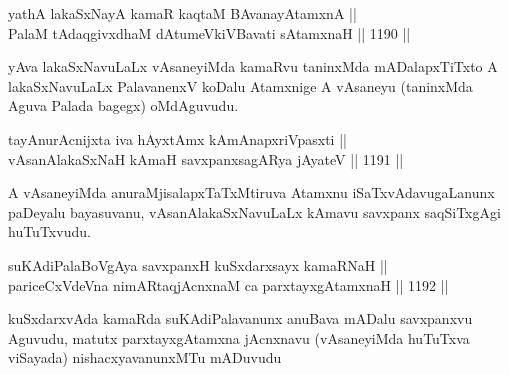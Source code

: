 
\begin{shl}
\footnotemark[2]yathA lakaSxNayA kamaR kaqtaM BAvanayA\s \s tamxnA || \\
PalaM tAdaqgivxdhaM dAtumeVkiVBavati sA\s \s tamxnaH \hfill || 1190 ||  
\end{shl}

\begin{artha}
yAva lakaSxNavuLaLx vAsaneyiMda kamaRvu taninxMda mADalapxTiTxto A lakaSxNavuLaLx PalavanenxV koDalu Atamxnige A vAsaneyu (taninxMda Aguva Palada bagegx) oMdAguvudu.
\end{artha}

\begin{shl}
\footnotemark[3]tayA\s nurAcnijxta iva hAyxtAmx kAmAnapxriVpasxti || \\
vAsanAlakaSxNaH kAmaH savxpanxsagARya jAyateV \hfill || 1191 || 
\end{shl}

\begin{artha}
A vAsaneyiMda anuraMjisalapxTaTxMtiruva Atamxnu iSaTxvAdavugaLanunx paDeyalu bayasuvanu, vAsanAlakaSxNavuLaLx kAmavu savxpanx saqSiTxgAgi huTuTxvudu.
\end{artha}


\begin{shl}
\footnotemark[4]suKAdiPalaBoVgAya savxpanxH kuSxdarxsayx kamaRNaH || \\
pariceCxVdeVna nimARtaqjAcnxnaM ca parxtayxgAtamxnaH \hfill || 1192 ||  
\end{shl}

\begin{artha}
kuSxdarxvAda kamaRda suKAdiPalavanunx anuBava mADalu savxpanxvu Aguvudu, matutx parxtayxgAtamxna jAcnxnavu (vAsaneyiMda huTuTxva viSayada) nishacxyavanunxMTu mADuvudu
\end{artha}


